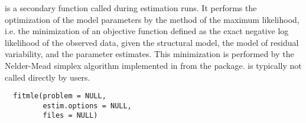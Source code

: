 %
\begin{Description}\relax
{} is a secondary function called during estimation runs. It 
performs the optimization of the model parameters by the method of the maximum
likelihood, i.e. the minimization of an objective function defined as the 
exact negative log likelihood of the observed data, given the structural 
model, the model of residual variability, and the parameter estimates. This 
minimization is performed by the Nelder-Mead simplex algorithm implemented in 
 from the  package.  is 
typically not called directly by users.
\end{Description}
%
\begin{Usage}
\begin{verbatim}
  fitmle(problem = NULL,
         estim.options = NULL,
         files = NULL)
\end{verbatim}
\end{Usage}
%
